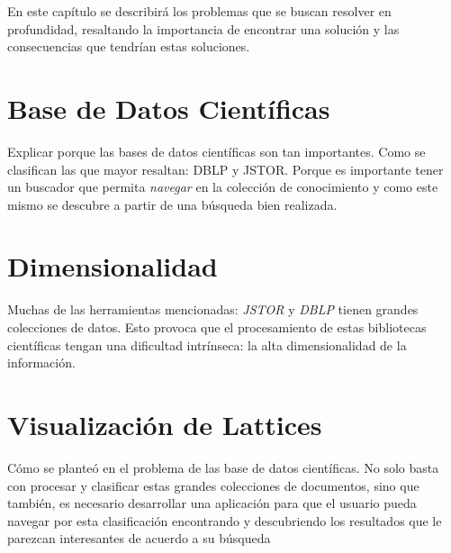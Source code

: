 En este capítulo se describirá los problemas que se buscan resolver en profundidad, resaltando la importancia de encontrar una solución y las consecuencias que tendrían estas soluciones.

\section{Base de Datos Científicas}
\label{sec:sciencedb}
Explicar porque las bases de datos científicas son tan importantes. Como se clasifican las que mayor resaltan: DBLP y JSTOR. Porque es importante tener un buscador que permita \emph{navegar} en la colección de conocimiento y como este mismo se descubre a partir de una búsqueda bien realizada.

\section{Dimensionalidad}
\label{sec:dimensionality}
Muchas de las herramientas mencionadas: \emph{JSTOR} y \emph{DBLP} tienen grandes colecciones de datos. Esto provoca que el procesamiento de estas bibliotecas científicas tengan una dificultad intrínseca: la alta dimensionalidad de la información.

\section{Visualización de Lattices}
\label{sec:latticevisualization}
Cómo se planteó en el problema de las base de datos científicas. No solo basta con procesar y clasificar estas grandes colecciones de documentos, sino que también, es necesario desarrollar una aplicación para que el usuario pueda navegar por esta clasificación encontrando y descubriendo los resultados que le parezcan interesantes de acuerdo a su búsqueda